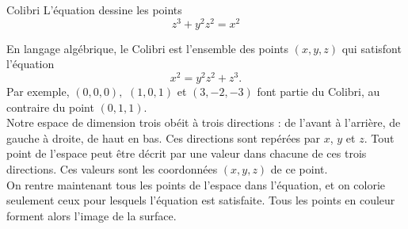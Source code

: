 \begin{surferPage}{Colibri}
L'équation dessine les points\\
  
  \smallskip
\[z^3+ y^2	z^2	= x^2\]

\singlespacing
En langage algébrique, le Colibri est l'ensemble des points $(x, y, z)$ qui satisfont l'équation
\smallskip
\[ x^2= y^2z^2+z^3.\]
\smallskip
Par exemple, $(0,0,0),$ $(1,0,1)$ et $(3,-2,-3)$ font partie du Colibri, au contraire du point $(0,1,1)$.\\
 \singlespacing
 Notre espace de dimension trois obéit à trois directions : de l'avant à l'arrière, de gauche à droite, de haut en bas. Ces directions sont repérées par $x$, $y$ et $z$. Tout point de l'espace peut être décrit par une valeur dans chacune de ces trois directions. Ces valeurs sont les coordonnées $(x,y,z)$ de ce point.\\
\singlespacing
On rentre maintenant tous les points de l'espace dans l'équation, et on colorie seulement ceux pour lesquels l'équation est satisfaite. Tous les points en couleur forment alors l'image de la surface.
\end{surferPage}
